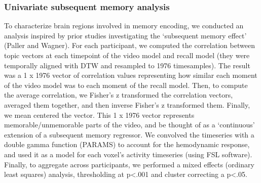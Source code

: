 \subsubsection{Univariate subsequent memory analysis}
To characterize brain regions involved in memory encoding, we conducted an analysis inspired by prior studies investigating the  `subsequent memory effect' (Paller and Wagner).  For each participant, we computed the correlation between topic vectors at each timepoint of the video model and recall model (they were temporally aligned with DTW and resampled to 1976 timesamples). The result was a 1 x 1976 vector of correlation values representing how similar each moment of the video model was to each moment of the recall model. Then, to compute the average correlation, we Fisher's z transformed the correlation vectors, averaged them together, and then inverse Fisher's z transformed them.  Finally, we mean centered the vector.  This 1 x 1976 vector represents memorable/unmemorable parts of the video, and be thought of as a `continuous' extension of a subsequent memory regressor.  We convolved the timeseries with a double gamma function (PARAMS) to account for the hemodynamic response, and used it as a model for each voxel's activity timeseries (using FSL software).  Finally, to aggregate across participants, we performed a mixed effects (ordinary least squares) analysis, thresholding at p<.001 and cluster correcting a p<.05.


